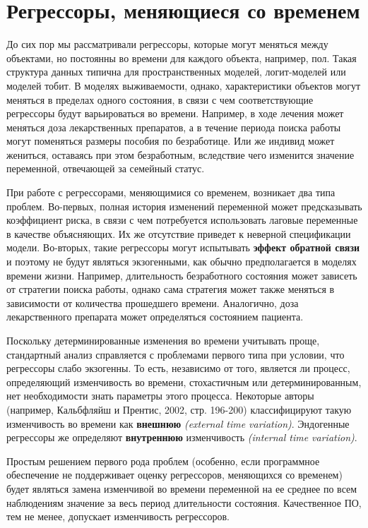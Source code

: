\section{Регрессоры, меняющиеся со временем}\label{sec:17.9}

\noindent
До сих пор мы рассматривали регрессоры, которые могут меняться между объектами, но постоянны во времени для каждого объекта, например, пол. Такая структура данных типична для пространственных моделей, логит-моделей или моделей тобит. В моделях выживаемости, однако, характеристики объектов могут меняться в пределах одного состояния, в связи с чем соответствующие регрессоры будут варьироваться во времени. Например, в ходе лечения может меняться доза лекарственных препаратов, а в течение периода поиска работы могут поменяться размеры пособия по безработице. Или же индивид может жениться, оставаясь при этом безработным, вследствие чего изменится значение переменной, отвечающей за семейный статус.

При работе с регрессорами, меняющимися со временем, возникает два типа проблем. Во-первых, полная история изменений переменной может предсказывать коэффициент риска, в связи с чем потребуется использовать лаговые переменные в качестве объясняющих. Их же отсутствие приведет к неверной спецификации модели. Во-вторых, такие регрессоры могут испытывать \textbf{эффект обратной связи} и поэтому не будут являться экзогенными, как обычно предполагается в моделях времени жизни. Например, длительность безработного состояния может зависеть от стратегии поиска работы, однако сама стратегия может также меняться в зависимости от количества прошедшего времени. Аналогично, доза лекарственного препарата может определяться состоянием пациента.

Поскольку детерминированные изменения во времени учитывать проще, стандартный анализ справляется с проблемами первого типа при условии, что регрессоры слабо экзогенны. То есть, независимо от того, является ли процесс, определяющий изменчивость во времени, стохастичным или детерминированным, нет необходимости знать параметры этого процесса. Некоторые авторы (например, Кальбфляйш и Прентис, 2002, стр. 196-200) классифицируют такую изменчивость во времени как \textbf{внешнюю} \textit{(external time variation)}. Эндогенные регрессоры же определяют \textbf{внутреннюю} изменчивость \textit{(internal time variation)}.

Простым решением первого рода проблем (особенно, если программное обеспечение не поддерживает оценку регрессоров, меняющихся со временем) будет являться замена изменчивой во времени переменной на ее среднее по всем наблюдениям значение за весь период длительности состояния. Качественное ПО, тем не менее, допускает изменчивость регрессоров.

